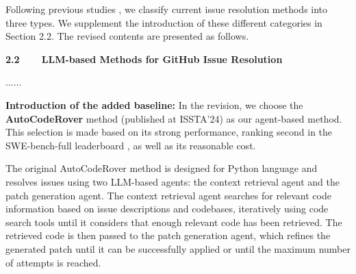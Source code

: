 \documentclass[12pt,american]{article}
\begin{document}
\begin{revresponse}
\begin{changes}


\end{changes}

Following previous studies , we classify current issue resolution methods into three types. We supplement the introduction of these different categories in Section 2.2. The revised contents are presented as follows.

\begin{changes}
\textbf{2.2~~~~LLM-based Methods for GitHub Issue Resolution}

......

\end{changes}

\textbf{Introduction of the added baseline:} In the revision, we choose the \textbf{AutoCodeRover} \text{[Ref6]} method (published at ISSTA'24) as our agent-based method. This selection is made based on its strong performance, ranking second in the SWE-bench-full leaderboard \text{[Ref4]}, as well as its reasonable cost. 

The original AutoCodeRover method is designed for Python language and resolves issues using two LLM-based agents: the context retrieval agent and the patch generation agent. The context retrieval agent searches for relevant code information based on issue descriptions and codebases, iteratively using code search tools until it considers that enough relevant code has been retrieved. The retrieved code is then passed to the patch generation agent, which refines the generated patch until it can be successfully applied or until the maximum number of attempts is reached.


\end{revresponse}
\end{document}
